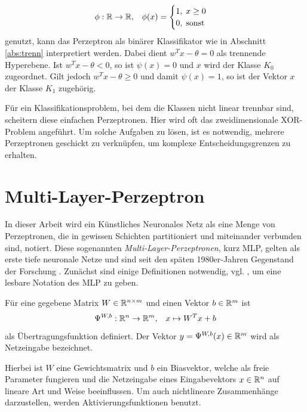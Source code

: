 \begin{equation*}
    \phi: \mathbb{R} \rightarrow \mathbb{R}, \; \; \;
    \phi(x)=\begin{cases}
       1 , \; x \geq 0 \\
       0 , \; \text{sonst}
    \end{cases}
\end{equation*} 
genutzt, kann das Perzeptron als binärer Klassifikator wie in Abschnitt \ref{abs:trenn} interpretiert werden. Dabei dient $w^T x-\theta=0$ als trennende Hyperebene. Ist $w^Tx-\theta<0$, so ist $\psi(x)=0$ und $x$ wird der Klasse $K_{0}$ zugeordnet. Gilt jedoch $w^T x-\theta \geq 0$ und damit $\psi(x)=1$, so ist der Vektor $x$ der Klasse $K_1$ zugehörig. 

Für ein Klassifikationsproblem, bei dem die Klassen nicht linear trennbar sind, scheitern diese einfachen Perzeptronen. Hier wird oft das zweidimensionale XOR-Problem angeführt. Um solche Aufgaben zu lösen, ist es notwendig, mehrere Perzeptronen geschickt zu verknüpfen, um komplexe Entscheidungsgrenzen zu erhalten.

\section{Multi-Layer-Perzeptron}
\label{MLP_abs}
In dieser Arbeit wird ein Künstliches Neuronales Netz als eine Menge von Perzeptronen, die in gewissen Schichten partitioniert und miteinander verbunden sind, notiert. Diese sogenannten \textit{Multi-Layer-Perzeptronen}, kurz MLP,  gelten als erste tiefe neuronale Netze und sind seit den späten 1980er-Jahren Gegenstand der Forschung \cite{bourlard1990links,bounds1988multilayer,MLPbook}. Zunächst sind einige Definitionen notwendig, vgl. \cite{gruening}, um eine lesbare Notation des MLP zu geben.

\begin{defi}[Übertragungsfunktion]
    \label{def_net}
    Für eine gegebene Matrix $W \in \mathbb{R}^{n \times m}$ und einen Vektor $b \in \mathbb{R}^m$ ist 
    \[ 
    \Psi^{W,b}: \mathbb{R}^n \rightarrow \mathbb{R}^m, \; \; \; x \mapsto W^T x +b
    \]
    als Übertragungsfunktion definiert. Der Vektor $y=\Psi^{W,b}(x) \in \mathbb{R}^m $ wird als Netzeingabe bezeichnet.
\end{defi}
Hierbei ist $W$ eine Gewichtsmatrix und $b$ ein Biasvektor, welche als freie Parameter fungieren und die Netzeingabe eines Eingabevektors $x \in \mathbb{R}^n$ auf lineare Art und Weise beeinflussen. Um auch nichtlineare Zusammenhänge darzustellen, werden Aktivierungsfunktionen benutzt.

